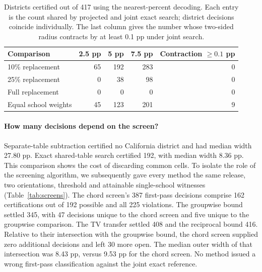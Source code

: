 \documentclass[11pt]{article}
\begin{document}
\begin{table}[ht]
\centering
\caption{Districts certified out of 417 using the nearest-percent decoding. Each entry is the count shared by projected and joint exact search; district decisions coincide individually. The last column gives the number whose two-sided radius contracts by at least 0.1 pp under joint search.}
\label{tab:edfacts}
\begin{tabular}{lrrrr}
\toprule
Comparison & 2.5 pp & 5 pp & 7.5 pp & Contraction $\ge 0.1$ pp\\
\midrule
10\% replacement &65&192&283&0\\
25\% replacement &0&38&98&0\\
Full replacement &0&0&0&0\\
Equal school weights &45&123&201&9\\
\bottomrule
\end{tabular}
\end{table}

\paragraph{How many decisions depend on the screen?}
Separate-table subtraction certified no California district and had median width 27.80 pp. Exact shared-table search certified 192, with median width 8.36 pp. This comparison shows the cost of discarding common cells. To isolate the role of the screening algorithm, we subsequently gave every method the same release, two orientations, threshold and attainable single-school witnesses (Table~\ref{tab:screens}). The chord screen's 387 first-pass decisions comprise 162 certifications out of 192 possible and all 225 violations. The groupwise bound settled 345, with 47 decisions unique to the chord screen and five unique to the groupwise comparison. The TV transfer settled 408 and the reciprocal bound 416. Relative to their intersection with the groupwise bound, the chord screen supplied zero additional decisions and left 30 more open. The median outer width of that intersection was 8.43 pp, versus 9.53 pp for the chord screen. No method issued a wrong first-pass classification against the joint exact reference.
\end{document}
